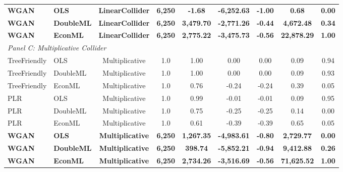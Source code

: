 \begin{table}[h]
{\begin{tabular}{llccccccc}
\textbf{WGAN} & \textbf{OLS} & \textbf{LinearCollider} & \textbf{6,250} & \textbf{-1.68} & \textbf{-6,252.63} & \textbf{-1.00} & \textbf{0.68} & \textbf{0.00} \\
\textbf{WGAN} & \textbf{DoubleML} & \textbf{LinearCollider} & \textbf{6,250} & \textbf{3,479.70} & \textbf{-2,771.26} & \textbf{-0.44} & \textbf{4,672.48} & \textbf{0.34} \\
\textbf{WGAN} & \textbf{EconML} & \textbf{LinearCollider} & \textbf{6,250} & \textbf{2,775.22} & \textbf{-3,475.73} & \textbf{-0.56} & \textbf{22,878.29} & \textbf{1.00} \\
\midrule
\multicolumn{9}{l}{\textit{Panel C: Multiplicative Collider}} \\
TreeFriendly & OLS & Multiplicative & 1.0 & 1.00 & 0.00 & 0.00 & 0.09 & 0.94 \\
TreeFriendly & DoubleML & Multiplicative & 1.0 & 1.00 & 0.00 & 0.00 & 0.09 & 0.93 \\
TreeFriendly & EconML & Multiplicative & 1.0 & 0.76 & -0.24 & -0.24 & 0.39 & 0.05 \\
PLR & OLS & Multiplicative & 1.0 & 0.99 & -0.01 & -0.01 & 0.09 & 0.95 \\
PLR & DoubleML & Multiplicative & 1.0 & 0.75 & -0.25 & -0.25 & 0.14 & 0.00 \\
PLR & EconML & Multiplicative & 1.0 & 0.61 & -0.39 & -0.39 & 0.65 & 0.05 \\
\textbf{WGAN} & \textbf{OLS} & \textbf{Multiplicative} & \textbf{6,250} & \textbf{1,267.35} & \textbf{-4,983.61} & \textbf{-0.80} & \textbf{2,729.77} & \textbf{0.00} \\
\textbf{WGAN} & \textbf{DoubleML} & \textbf{Multiplicative} & \textbf{6,250} & \textbf{398.74} & \textbf{-5,852.21} & \textbf{-0.94} & \textbf{9,412.88} & \textbf{0.26} \\
\textbf{WGAN} & \textbf{EconML} & \textbf{Multiplicative} & \textbf{6,250} & \textbf{2,734.26} & \textbf{-3,516.69} & \textbf{-0.56} & \textbf{71,625.52} & \textbf{1.00} \\
\bottomrule
\end{tabular}%
}
\end{table}
